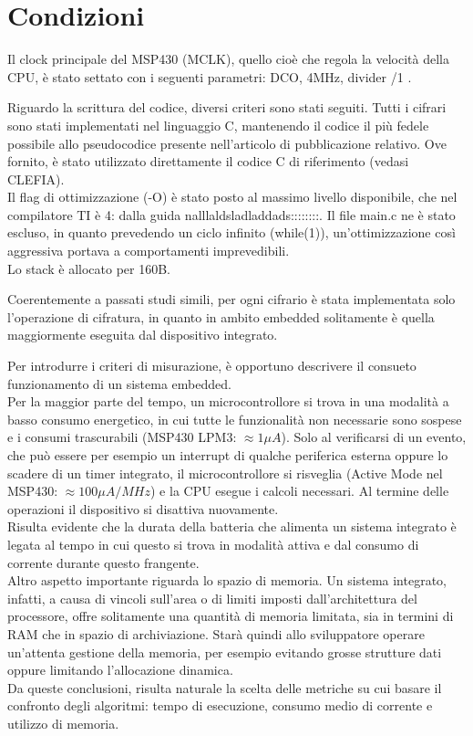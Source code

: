 \documentclass[target=bach,aauheader=,style=]{thud}
\begin{document}
	\section{Condizioni}
	Il clock principale del MSP430 (MCLK), quello cioè che regola la velocità della CPU, è stato settato con i seguenti parametri: DCO, 4MHz, divider /1 \cite{mspuser}.
	
	Riguardo la scrittura del codice, diversi criteri sono stati seguiti. Tutti i cifrari sono stati implementati nel linguaggio C, mantenendo il codice il più fedele possibile allo pseudocodice presente nell'articolo di pubblicazione relativo. Ove fornito, è stato utilizzato direttamente il codice C di riferimento (vedasi CLEFIA).\\
	Il flag di ottimizzazione (-O) è stato posto al massimo livello disponibile, che nel compilatore TI è 4: dalla guida nalllaldsladladdads::::::::. Il file main.c ne è stato escluso, in quanto prevedendo un ciclo infinito (while(1)), un'ottimizzazione così aggressiva portava a comportamenti imprevedibili.\\
	Lo stack è allocato per 160B.
	
	Coerentemente a passati studi simili,%
	per ogni cifrario è stata implementata solo l'operazione di cifratura, in quanto in ambito embedded solitamente è quella maggiormente eseguita dal dispositivo integrato.
	
	Per introdurre i criteri di misurazione, è opportuno descrivere il consueto funzionamento di un sistema embedded.\\
	Per la maggior parte del tempo, un microcontrollore si trova in una modalità a basso consumo energetico, in cui tutte le funzionalità non necessarie sono sospese e i consumi trascurabili (MSP430 LPM3: $\approx 1 \mu A$). Solo al verificarsi di un evento, che può essere per esempio un interrupt di qualche periferica esterna oppure lo scadere di un timer integrato, il microcontrollore si risveglia (Active Mode nel MSP430: $\approx 100 \mu A /MHz$) e la CPU esegue i calcoli necessari. Al termine delle operazioni il dispositivo si disattiva nuovamente.\\
	Risulta evidente che la durata della batteria che alimenta un sistema integrato è legata al tempo in cui questo si trova in modalità attiva e dal consumo di corrente durante questo frangente.\\
	Altro aspetto importante riguarda lo spazio di memoria. Un sistema integrato, infatti, a causa di vincoli sull'area o di limiti imposti dall'architettura del processore, offre solitamente una quantità di memoria limitata, sia in termini di RAM che in spazio di archiviazione. Starà quindi allo sviluppatore operare un'attenta gestione della memoria, per esempio evitando grosse strutture dati oppure limitando l'allocazione dinamica.\\
	Da queste conclusioni, risulta naturale la scelta delle metriche su cui basare il confronto degli algoritmi: tempo di esecuzione, consumo medio di corrente e utilizzo di memoria.
	
\end{document}
